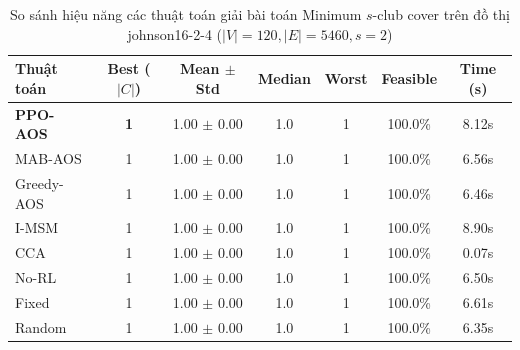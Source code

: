 \begin{table}[htbp]
\centering
\caption{So sánh hiệu năng các thuật toán giải bài toán Minimum $s$-club cover trên đồ thị johnson16-2-4 ($|V|=120, |E|=5460, s=2$)}
\label{tab:results_johnson16_2_4}
\begin{tabular}{lcccccc}
\hline
\textbf{Thuật toán} & \textbf{Best ($|C|$)} & \textbf{Mean $\pm$ Std} & \textbf{Median} & \textbf{Worst} & \textbf{Feasible} & \textbf{Time (s)} \\
\hline
\textbf{PPO-AOS} & \textbf{1} & 1.00 $\pm$ 0.00 & 1.0 & 1 & 100.0\% & 8.12s \\
MAB-AOS & 1 & 1.00 $\pm$ 0.00 & 1.0 & 1 & 100.0\% & 6.56s \\
Greedy-AOS & 1 & 1.00 $\pm$ 0.00 & 1.0 & 1 & 100.0\% & 6.46s \\
I-MSM & 1 & 1.00 $\pm$ 0.00 & 1.0 & 1 & 100.0\% & 8.90s \\
CCA & 1 & 1.00 $\pm$ 0.00 & 1.0 & 1 & 100.0\% & 0.07s \\
No-RL & 1 & 1.00 $\pm$ 0.00 & 1.0 & 1 & 100.0\% & 6.50s \\
Fixed & 1 & 1.00 $\pm$ 0.00 & 1.0 & 1 & 100.0\% & 6.61s \\
Random & 1 & 1.00 $\pm$ 0.00 & 1.0 & 1 & 100.0\% & 6.35s \\
\hline
\end{tabular}
\end{table}
